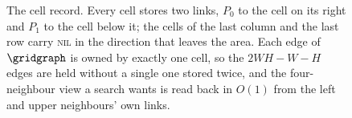 \begin{figure}[htbp]
  \centering
  \caption{The cell record. Every cell stores two links, $P_0$ to the cell on
  its right and $P_1$ to the cell below it; the cells of the last column and
  the last row carry \textsc{nil} in the direction that leaves the area. Each
  edge of $\gridgraph$ is owned by exactly one cell, so the $2WH-W-H$ edges are
  held without a single one stored twice, and the four-neighbour view a search
  wants is read back in $O(1)$ from the left and upper neighbours' own links.}
  \label{fig:cell-record}
\end{figure}
